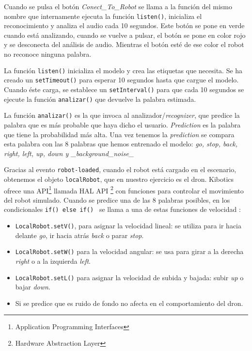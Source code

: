 Cuando se pulsa el botón \textit{Conect\_To\_Robot} se llama a la función del mismo nombre que internamente ejecuta  la función \texttt{listen()},  inicializa el reconocimiento y analiza el audio cada 10 segundos.
Este botón se pone en verde cuando está analizando, cuando se vuelve a pulsar, el botón se pone en color rojo y se desconecta del análisis de audio. Mientras el botón esté de ese color el robot no reconoce ninguna palabra.

La función \texttt{listen()} inicializa el modelo y crea las etiquetas que necesita. Se ha creado un \texttt{setTimeout()} para esperar 10 segundos hasta que cargue el modelo. Cuando éste carga, se establece un \texttt{setInterval()} para que cada 10 segundos se ejecute la función \texttt{analizar()} que devuelve la palabra estimada.

La función \texttt{analizar()} es la que invoca al analizador/\textit{recognizer}, que predice la palabra que es más probable que haya dicho el usuario.  \textit{Prediction} es la palabra que tiene la probabilidad más alta. Una vez tenemos la \textit{prediction} se compara esta palabra con las 8 palabras que hemos entrenado el modelo: \textit{go, stop, back, right, left, up, down y \_background\_noise\_}

Gracias al evento \texttt{robot-loaded}, cuando el robot está cargado en el escenario, obtenemos el objeto \texttt{localRobot}, que en nuestro ejercicio es el dron. Kibotics ofrece una API\footnote{Application Programming Interfaces} llamada HAL API \footnote{Hardware Abstraction Layer} con funciones para controlar el movimiento del robot simulado. Cuando se predice una de las 8 palabras posibles, en los condicionales \texttt{if(){} else if() {}} se llama a una de estas funciones de velocidad :
\begin{itemize}
\item \texttt{LocalRobot.setV()}, para asignar la velocidad lineal: se utiliza para ir hacia delante \textit{go}, ir hacia atrás \textit{back} o parar \textit{stop}.
\item \texttt{LocalRobot.setW()} para la velocidad angular: se usa para girar a la derecha \textit{right} o a la izquierda \textit{left}.
\item \texttt{LocalRobot.setL()} para asignar la velocidad de subida y bajada: subir \textit{up} o bajar \textit{down}. 
\item Si se predice que es ruido de fondo no afecta en el comportamiento del dron.
\end{itemize}

